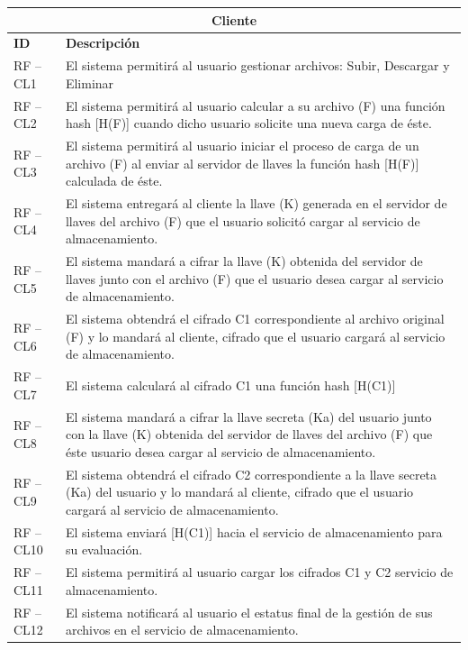 \begin{table}[htb]
\centering
\begin{tabular}{| p{2cm} |  p{13.5cm} |}
\hline
\multicolumn{2}{|c|}{\textbf{Cliente}} \\ \hline
\textbf{ID} &  \textbf{Descripción} \\
\hline \hline
RF – CL1 & El sistema permitirá al usuario gestionar archivos: Subir, Descargar y Eliminar \\ \hline
RF – CL2 & El sistema permitirá al usuario calcular a su archivo (F) una función hash [H(F)] cuando dicho usuario solicite una nueva carga de éste. \\ \hline
RF – CL3 & El sistema permitirá al usuario iniciar el proceso de carga de un archivo (F) al enviar al servidor de llaves la función hash [H(F)] calculada de éste. \\ \hline
RF – CL4 & El sistema entregará al cliente la llave (K) generada en el servidor de llaves del archivo (F) que el usuario solicitó cargar al servicio de almacenamiento.  \\ \hline
RF – CL5 & El sistema mandará a cifrar la llave (K) obtenida del servidor de llaves junto con el archivo (F) que el usuario desea cargar al servicio de almacenamiento. \\ \hline
RF – CL6 & El sistema obtendrá el cifrado C1 correspondiente al archivo original (F)  y lo mandará al cliente, cifrado que el usuario cargará al servicio de almacenamiento.  \\ \hline
RF – CL7  & El sistema calculará al cifrado C1 una función hash [H(C1)] \\ \hline
RF – CL8  & El sistema mandará a cifrar la llave secreta (Ka) del usuario junto con la llave (K) obtenida del servidor de llaves del archivo (F) que éste usuario desea cargar al servicio de almacenamiento. \\ \hline
RF – CL9  & El sistema obtendrá el cifrado C2 correspondiente a la llave secreta (Ka) del usuario y lo mandará al cliente, cifrado que el usuario cargará al servicio de almacenamiento. \\ \hline
RF – CL10 & El sistema enviará [H(C1)] hacia el servicio de almacenamiento para su evaluación. \\ \hline
RF – CL11 & El sistema permitirá al usuario cargar los cifrados C1 y C2 servicio de almacenamiento. \\ \hline
RF – CL12 & El sistema notificará al usuario el estatus final de la gestión de sus archivos en el servicio de almacenamiento.  \\ \hline

\end{tabular}
\end{table}
